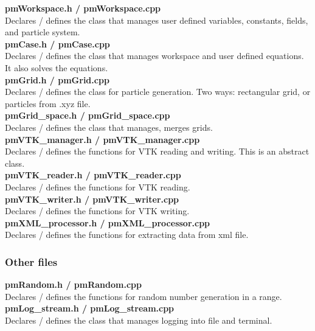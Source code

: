 \documentclass[a4paper,12pt,openany]{book}
\theoremstyle{break}
\begin{document}
\textbf{pmWorkspace.h / pmWorkspace.cpp} \\
Declares / defines the class that manages user defined variables, constants, fields, and particle system. \\

\textbf{pmCase.h / pmCase.cpp} \\
Declares / defines the class that manages workspace and user defined equations. It also solves the equations. \\

\textbf{pmGrid.h / pmGrid.cpp} \\
Declares / defines the class for particle generation. Two ways: rectangular grid, or particles from .xyz file. \\

\textbf{pmGrid\_space.h / pmGrid\_space.cpp} \\
Declares / defines the class that manages, merges grids. \\

\textbf{pmVTK\_manager.h / pmVTK\_manager.cpp} \\
Declares / defines the functions for VTK reading and writing. This is an abstract class. \\

\textbf{pmVTK\_reader.h / pmVTK\_reader.cpp} \\
Declares / defines the functions for VTK reading. \\

\textbf{pmVTK\_writer.h / pmVTK\_writer.cpp} \\
Declares / defines the functions for VTK writing. \\

\textbf{pmXML\_processor.h / pmXML\_processor.cpp} \\
Declares / defines the functions for extracting data from xml file. \\

\subsubsection{Other files}
\textbf{pmRandom.h / pmRandom.cpp} \\
Declares / defines the functions for random number generation in a range. \\

\textbf{pmLog\_stream.h / pmLog\_stream.cpp} \\
Declares / defines the class that manages logging into file and terminal. \\
\end{document}
